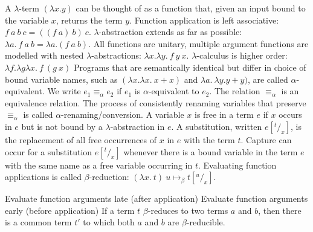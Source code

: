  A $\lambda$-term $(\lambda x. y)$ can be thought of as a function that, given an input bound to the variable $x$, returns the term $y$.
 Function application is left associative: $f\ a\ b\ c = ((f\ a)\ b)\ c$. $\lambda$-abstraction extends as far as possible: $\lambda a.\ f\ a\ b = \lambda a. (f\ a\ b)$. All functions are unitary, multiple argument functions are modelled with nested $\lambda$-abstractions: $\lambda x.\lambda y.\ f\ y\ x$. $\lambda$-calculus is higher order: $\lambda f.\lambda g\lambda x.\ f\ (g\ x)$
 Programs that are semantically identical but differ in choice of bound variable names, such as $(\lambda x. \lambda x.\ x+x)$ and $\lambda a.\ \lambda y. y+y)$, are called $\alpha$-equivalent. We write $e_1 \equiv_{\alpha} e_2$ if $e_1$ is $\alpha$-equivalent to $e_2$. The relation $\equiv_{\alpha}$ is an equivalence relation.
 The process of consistently renaming variables that preserve $\equiv_\alpha$ is called $\alpha$-renaming/conversion.
 A variable $x$ is free in a term $e$ if $x$ occurs in $e$ but is not bound by a $\lambda$-abstraction in $e$.
 A substitution, written $e[^t/_x]$, is the replacement of all free  occurrences of $x$ in $e$ with the term $t$.
 Capture can occur for a substitution $e[^t/_x]$ whenever there is a bound variable in the term $e$ with the same name as a free variable occurring in $t$.
 Evaluating function applications is called $\beta$-reduction: $(\lambda x.\ t)\ u \mapsto_{\beta} t[^u/_x]$.
\begin{prooftree}
\end{prooftree}
\begin{prooftree}
\end{prooftree}
\begin{prooftree}
\end{prooftree}
\begin{prooftree}
\end{prooftree}
 Evaluate function arguments late (after application)
 Evaluate function arguments early (before application)
 If a term $t$ $\beta$-reduces to two terms $a$ and $b$, then there is a common term $t'$ to which both $a$ and $b$ are $\beta$-reducible.
